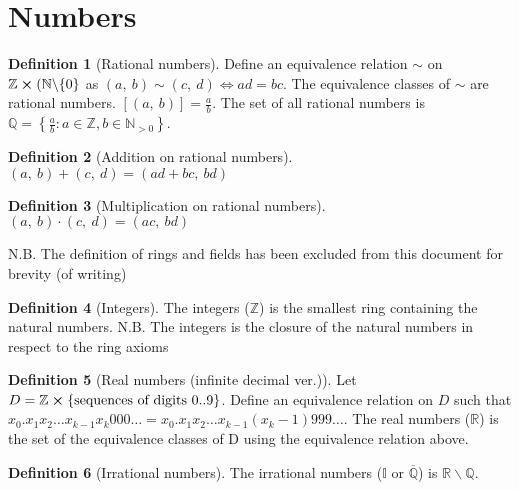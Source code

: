 \documentclass{article}
\theoremstyle{plain}
\numberwithin{theorem}{section}
\theoremstyle{definition}
\newtheorem{definition}{Definition}[section]
\numberwithin{definition}{section}
\newcommand*{\N}{\mathbb{N}}
\newcommand*{\Z}{\mathbb{Z}}
\newcommand*{\Q}{\mathbb{Q}}
\newcommand*{\I}{\mathbb{I}}
\newcommand*{\R}{\mathbb{R}}
\begin{document}
\section{Numbers}
%
\begin{definition}[Rational numbers]
    Define an equivalence relation $\sim$ on $\Z \cross (\N\backslash\{0\}$
    as $(a,\: b) \sim (c,\: d) \iff ad=bc$.
    The equivalence classes of $\sim$ are rational numbers.
    $[(a,\: b)] = \frac{a}{b}$.
    The set of all rational numbers is
    $\Q = \left\{ \frac{a}{b} : a\in \Z, b\in \N_{>0} \right\}$.
\end{definition}
%
\begin{definition}[Addition on rational numbers]
    $(a,\: b) + (c,\: d) = (ad+bc,\: bd)$
\end{definition}
%
\begin{definition}[Multiplication on rational numbers]
    $(a,\: b) \cdot (c,\: d) = (ac,\: bd)$
\end{definition}
%
N.B. The definition of rings and fields has been excluded from this document for brevity (of writing)
%
\begin{definition}[Integers]
    The integers ($\Z$) is the smallest ring containing the natural numbers.
    N.B. The integers is the closure of the natural numbers in respect to the ring axioms
\end{definition}
%
\begin{definition}[Real numbers (infinite decimal ver.)]
    Let $D = \Z \cross \{\text{sequences of digits 0..9}\}$.
    Define an equivalence relation on $D$ such that
    $x_0 . x_1 x_2 \dots x_{k-1} x_k 000 \dots
    = x_0 . x_1 x_2 \dots x_{k-1} (x_k -1)999 \dots$.
    The real numbers ($\R$) is the set of the equivalence classes of D using the equivalence relation above.
\end{definition}
%
\begin{definition}[Irrational numbers]
    The irrational numbers ($\I$ or $\overline{\Q}$) is $\R\backslash\Q$.
\end{definition}
%
\end{document}
